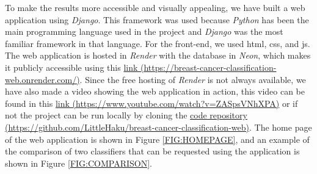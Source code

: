 
To make the results more accessible and visually appealing, we have built a web application using \textit{Django}. This framework was used because \textit{Python} has been the main programming language used in the project and \textit{Django} was the most familiar framework in that language. For the front-end, we used \ac{html}, \ac{css}, and \ac{js}. The web application is hosted in \textit{Render} with the database in \textit{Neon}, which makes it publicly accessible using this \href{https://breast-cancer-classification-web.onrender.com/}{link (https://breast-cancer-classification-web.onrender.com/)}. Since the free hosting of \textit{Render} is not always available, we have also made a video showing the web application in action, this video can be found in this \href{https://www.youtube.com/watch?v=ZASpsVNhXPA}{link (https://www.youtube.com/watch?v=ZASpsVNhXPA)} or if not the project can be run locally by cloning the \href{https://github.com/LittleHaku/breast-cancer-classification-web}{code repository (https://github.com/LittleHaku/breast-cancer-classification-web)}.
The home page of the web application is shown in Figure \ref{FIG:HOMEPAGE}, and an example of the comparison of two classifiers that can be requested using the application is shown in Figure \ref{FIG:COMPARISON}.
